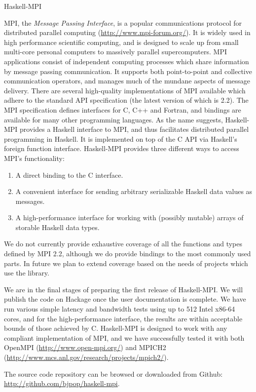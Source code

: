 \documentclass{scrreprt}
\begin{document}
\begin{hcarentry}{Haskell-MPI}
\makeheader

MPI, the \emph{Message Passing Interface}, is a popular communications protocol
for distributed parallel computing (\url{http://www.mpi-forum.org/}). It is widely
used in high performance scientific computing, and is designed to scale up from
small multi-core personal computers to massively parallel supercomputers.
MPI applications
consist of independent computing processes which share information by message passing
communication. It supports both point-to-point and collective communication operators,
and manages much of the mundane aspects of message delivery. There are several
high-quality implementations of MPI available which adhere to the standard API
specification (the latest version of which is 2.2). The MPI specification defines
interfaces for C, C++ and Fortran, and bindings are available for many other
programming languages. As the name suggests, Haskell-MPI provides a Haskell interface
to MPI, and thus facilitates distributed parallel programming in Haskell. It is implemented
on top of the C API via Haskell's foreign function interface. Haskell-MPI provides
three different ways to access MPI's functionality:
\begin{enumerate}
   \item A direct binding to the C interface.
   \item A convenient interface for sending arbitrary serializable Haskell data values as messages.
   \item A high-performance interface for working with (possibly mutable) arrays of storable
         Haskell data types.
\end{enumerate}
We do not currently provide exhaustive coverage of all the functions and types defined by MPI
2.2, although we do provide bindings to the most commonly used parts. In future we plan
to extend coverage based on the needs of projects which use the library.

We are in the final stages of preparing the first release of Haskell-MPI. We will
publish the code on Hackage once the user documentation is complete.
We have run various simple latency and bandwidth tests using up to 512 Intel x86-64 cores, and
for the high-performance interface, the results are within acceptable bounds of those
achieved by C.
Haskell-MPI is designed to work with any compliant implementation of MPI, and we
have successfully tested it with both OpenMPI (\url{http://www.open-mpi.org/}) and
MPICH2 (\url{http://www.mcs.anl.gov/research/projects/mpich2/}).

The source code repository can be browsed or downloaded from Github:
  \url{http://github.com/bjpop/haskell-mpi}.

\end{hcarentry}
\end{document}
